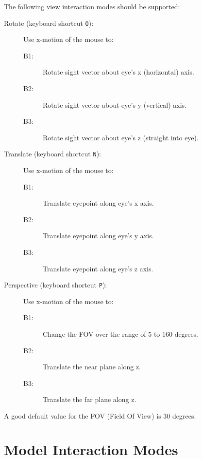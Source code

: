 The following view interaction modes should be supported:
\begin{description}
    \item[Rotate (keyboard shortcut {\tt O}):] Use x-motion of the mouse to: \hfill
                \begin{description}
            \item[B1:] Rotate sight vector about eye's x (horizontal) axis.
            \item[B2:] Rotate sight vector about eye's y (vertical) axis.
            \item[B3:] Rotate sight vector about eye's z (straight into eye).
                \end{description}
    \item[Translate (keyboard shortcut {\tt N}):] Use x-motion of the mouse to: \hfill
                \begin{description}
            \item[B1:] Translate eyepoint along eye's x axis.
            \item[B2:] Translate eyepoint along eye's y axis.
            \item[B3:] Translate eyepoint along eye's z axis.
                \end{description}
    \item[Perspective (keyboard shortcut {\tt P}):] Use x-motion of the mouse to: \hfill
                \begin{description}
            \item[B1:] Change the FOV over the range of 5 to 160 
                degrees.
            \item[B2:] Translate the near plane along z.
            \item[B3:] Translate the far plane along z.
                \end{description}
\end{description}
A good default value for the FOV (Field Of View) is 30 degrees.

\section{Model Interaction Modes}


